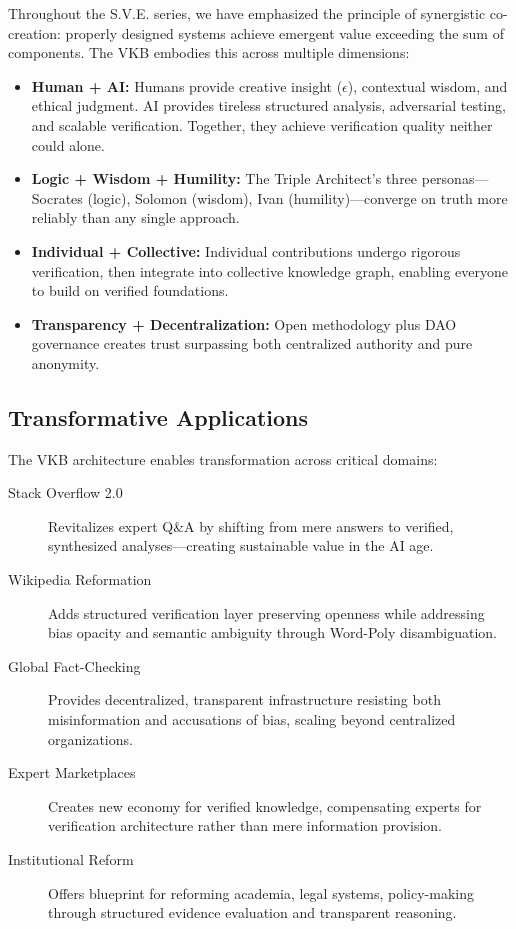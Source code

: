 \documentclass[11pt,a4paper]{article}
\theoremstyle{definition}
\theoremstyle{remark}
\newcommand{\VKB}{\textsc{VKB}}
\newcommand{\DAO}{\textsc{DAO}}
\begin{document}
Throughout the S.V.E. series, we have emphasized the principle of synergistic co-creation: properly designed systems achieve emergent value exceeding the sum of components. The \VKB{} embodies this across multiple dimensions:

\begin{itemize}
    \item \textbf{Human + AI:} Humans provide creative insight ($\epsilon$), contextual wisdom, and ethical judgment. AI provides tireless structured analysis, adversarial testing, and scalable verification. Together, they achieve verification quality neither could alone.
    
    \item \textbf{Logic + Wisdom + Humility:} The Triple Architect's three personas—Socrates (logic), Solomon (wisdom), Ivan (humility)—converge on truth more reliably than any single approach.
    
    \item \textbf{Individual + Collective:} Individual contributions undergo rigorous verification, then integrate into collective knowledge graph, enabling everyone to build on verified foundations.
    
    \item \textbf{Transparency + Decentralization:} Open methodology plus \DAO{} governance creates trust surpassing both centralized authority and pure anonymity.
\end{itemize}

\subsection{Transformative Applications}

The \VKB{} architecture enables transformation across critical domains:

\begin{description}
    \item[Stack Overflow 2.0] Revitalizes expert Q\&A by shifting from mere answers to verified, synthesized analyses—creating sustainable value in the AI age.
    
    \item[Wikipedia Reformation] Adds structured verification layer preserving openness while addressing bias opacity and semantic ambiguity through Word-Poly disambiguation.
    
    \item[Global Fact-Checking] Provides decentralized, transparent infrastructure resisting both misinformation and accusations of bias, scaling beyond centralized organizations.
    
    \item[Expert Marketplaces] Creates new economy for verified knowledge, compensating experts for verification architecture rather than mere information provision.
    
    \item[Institutional Reform] Offers blueprint for reforming academia, legal systems, policy-making through structured evidence evaluation and transparent reasoning.
\end{description}
\end{document}

